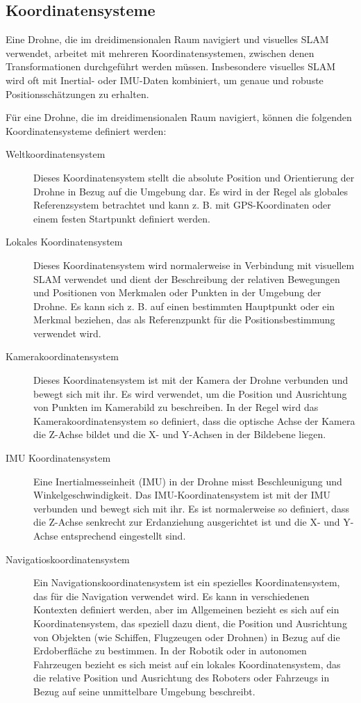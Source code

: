 \subsection{Koordinatensysteme}

Eine Drohne, die im dreidimensionalen Raum navigiert und visuelles SLAM verwendet, arbeitet mit mehreren Koordinatensystemen, zwischen denen Transformationen durchgeführt werden müssen. Insbesondere visuelles SLAM wird oft mit Inertial- oder IMU-Daten kombiniert, um genaue und robuste Positionsschätzungen zu erhalten.

Für eine Drohne, die im dreidimensionalen Raum navigiert, können die folgenden Koordinatensysteme definiert werden:

\begin{description}
    \item[Weltkoordinatensystem]{Dieses Koordinatensystem stellt die absolute Position und Orientierung der Drohne in Bezug auf die Umgebung dar. Es wird in der Regel als globales Referenzsystem betrachtet und kann z. B. mit \ac{GPS}-Koordinaten oder einem festen Startpunkt definiert werden.}
    \item[Lokales Koordinatensystem]{Dieses Koordinatensystem wird normalerweise in Verbindung mit visuellem SLAM verwendet und dient der Beschreibung der relativen Bewegungen und Positionen von Merkmalen oder Punkten in der Umgebung der Drohne. Es kann sich z. B. auf einen bestimmten Hauptpunkt oder ein Merkmal beziehen, das als Referenzpunkt für die Positionsbestimmung verwendet wird.}
    \item[Kamerakoordinatensystem]{
        Dieses Koordinatensystem ist mit der Kamera der Drohne verbunden und bewegt sich mit ihr. Es wird verwendet, um die Position und Ausrichtung von Punkten im Kamerabild zu beschreiben. In der Regel wird das Kamerakoordinatensystem so definiert, dass die optische Achse der Kamera die Z-Achse bildet und die X- und Y-Achsen in der Bildebene liegen.} 
    \item[\ac{IMU} Koordinatensystem]{Eine Inertialmesseinheit (IMU) in der Drohne misst Beschleunigung und Winkelgeschwindigkeit. Das IMU-Koordinatensystem ist mit der IMU verbunden und bewegt sich mit ihr. Es ist normalerweise so definiert, dass die Z-Achse senkrecht zur Erdanziehung ausgerichtet ist und die X- und Y-Achse entsprechend eingestellt sind.} 
    \item[Navigatioskoordinatensystem]{Ein Navigationskoordinatensystem ist ein spezielles Koordinatensystem, das für die Navigation verwendet wird. Es kann in verschiedenen Kontexten definiert werden, aber im Allgemeinen bezieht es sich auf ein Koordinatensystem, das speziell dazu dient, die Position und Ausrichtung von Objekten (wie Schiffen, Flugzeugen oder Drohnen) in Bezug auf die Erdoberfläche zu bestimmen. In der Robotik oder in autonomen Fahrzeugen bezieht es sich meist auf ein lokales Koordinatensystem, das die relative Position und Ausrichtung des Roboters oder Fahrzeugs in Bezug auf seine unmittelbare Umgebung beschreibt.} 
\end{description}


